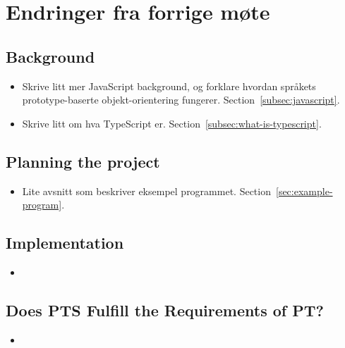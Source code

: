 
\chapter*{Endringer fra forrige møte}

\section*{Background}

\begin{itemize}
    \item Skrive litt mer JavaScript background, og forklare hvordan språkets prototype-baserte objekt-orientering fungerer.
    Section~\vref{subsec:javascript}.
    \item Skrive litt om hva TypeScript er.
    Section~\vref{subsec:what-is-typescript}.
\end{itemize}

\section*{Planning the project}

\begin{itemize}
    \item Lite avsnitt som beskriver eksempel programmet.
    Section~\vref{sec:example-program}.
\end{itemize}

\section*{Implementation}

\begin{itemize}
    \item
\end{itemize}

\section*{Does PTS Fulfill the Requirements of PT?}

\begin{itemize}
    \item
\end{itemize}
